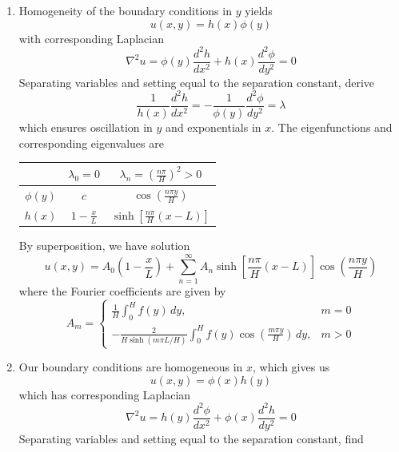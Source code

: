 \documentclass[a4paper]{article}
\begin{document}
\begin{enumerate}[label=(\alph*)]
\[	\]
	\item Homogeneity of the boundary conditions in \( y \) yields
	\[
		u \!\left( x,y \right) = h \!\left( x \right)\phi \!\left( y \right) 
	\]
	with corresponding Laplacian
	\[
		\nabla^{2}u = \phi \!\left( y \right)\frac{d^2 h}{d x^2} + h \!\left( x \right)\frac{d^2 \phi}{d y^2} = 0 
	\]
	Separating variables and setting equal to the separation constant, derive
	\[
		\frac{1}{h \!\left( x \right)}\frac{d^2 h}{d x^2} = -\frac{1}{\phi \!\left( y \right)}\frac{d^2 \phi}{d y^2} = \lambda 
	\]
	which ensures oscillation in \( y \) and exponentials in \( x \). The eigenfunctions and corresponding eigenvalues are
	\begin{center}
		\renewcommand{\arraystretch}{1.8}
		\setlength{\arraycolsep}{10pt}
		\begin{tabular}{|c||c|c|}
			\hline
			\rule[-1.2em]{0pt}{3em}
			 & \( \lambda_{0} = 0 \) & \( \lambda_{n} = \displaystyle{\!\left( \frac{n \pi}{H} \right)^{2}} > 0 \) \\
			\hline\hline
			\rule[-1.2em]{0pt}{3em}
					\( \phi \!\left( y \right) \) & \( c \) & \( \displaystyle{\cos\!\left(\frac{n \pi y}{H}\right)} \) \\
			\hline
			\rule[-1.2em]{0pt}{3em}
					\( h \!\left( x \right) \) & \( \displaystyle{1 - \frac{x}{L}} \) & \( \displaystyle{\sinh\!\left[\frac{n \pi}{H}\!\left( x - L \right)\right]} \) \\
			\hline
		\end{tabular}
	\end{center}
	By superposition, we have solution
	\[
		u \!\left( x,y \right) = A_{0}\!\left( 1 - \frac{x}{L} \right) + \sum^{\infty}_{n=1} A_{n}\sinh\!\left[\frac{n \pi}{H}\!\left( x - L \right)\right]\cos\!\left(\frac{n \pi y}{H}\right)
	\]
	where the Fourier coefficients are given by
	\[
		A_{m} =
		\begin{cases}
			\displaystyle{\frac{1}{H}\int^{H}_{0} f \!\left( y \right) \, dy}, & m = 0 \\
			\displaystyle{-\frac{2}{H \sinh\!\left(m \pi L / H\right)}\int^{H}_{0} f \!\left( y \right)\cos\!\left(\frac{m \pi y}{H}\right) \, dy}, & m > 0 
		\end{cases}
	\]
	\item Our boundary conditions are homogeneous in \( x \), which gives us
	\[
		u \!\left( x,y \right) = \phi \!\left( x \right)h \!\left( y \right)
	\]
	which has corresponding Laplacian
	\[
		\nabla^{2}u = h \!\left( y \right)\frac{d^2 \phi}{d x^2} + \phi \!\left( x \right)\frac{d^2 h}{d y^2} = 0
	\]
	Separating variables and setting equal to the separation constant, find

\end{enumerate}
\end{document}
